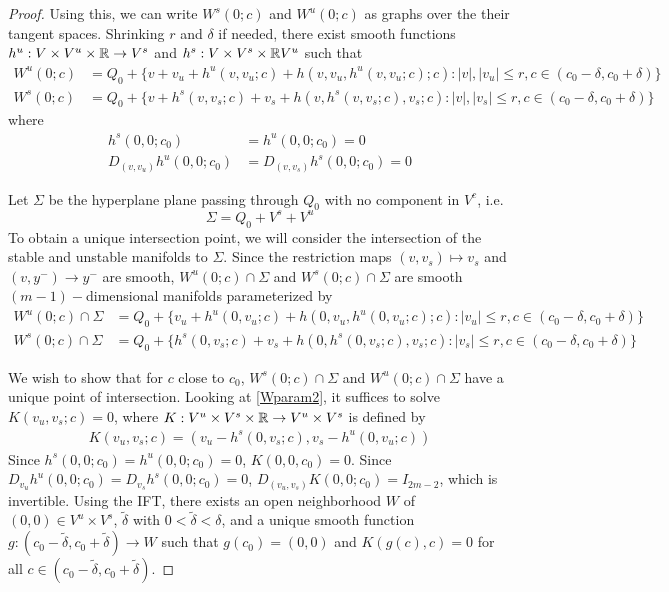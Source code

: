\documentclass[thesis.tex]{subfiles}
\begin{document}
\begin{lemma}
\begin{proof}
Using this, we can write $W^s(0; c)$ and $W^u(0; c)$ as graphs over the their tangent spaces. Shrinking $r$ and $\delta$ if needed, there exist smooth functions $h^u: V \times V^u \times \mathbb{R} \rightarrow V^s$ and $h^s: V \times V^s \times \mathbb{R} V^u$ such that 
\begin{equation}\label{Wparam1}
\begin{aligned}
W^u(0; c) &= Q_0 + \{ v + v_u + h^u(v, v_u; c) + h(v, v_u, h^u(v, v_u; c); c): |v|, |v_u| \leq r, c \in (c_0 - \delta, c_0 + \delta) \} \\
W^s(0; c) &= Q_0 + \{ v + h^s(v, v_s; c) + v_s + h(v, h^s(v, v_s; c), v_s; c): |v|, |v_s| \leq r, c \in (c_0 - \delta, c_0 + \delta)  \}
\end{aligned}
\end{equation}
where
\begin{align*}
h^s(0, 0; c_0) &= h^u(0, 0; c_0) = 0 \\
D_{(v, v_u)} h^u(0, 0; c_0) &= D_{(v, v_s)}  h^s(0, 0; c_0) = 0
\end{align*}

Let $\Sigma$ be the hyperplane plane passing through $Q_0$ with no component in $V^c$, i.e.
\[
\Sigma = Q_0 + V^s + V^u
\]
To obtain a unique intersection point, we will consider the intersection of the stable and unstable manifolds to $\Sigma$. Since the restriction maps $(v, v_s) \mapsto v_s$ and $(v, y^-) \rightarrow y^-$ are smooth, $W^u(0; c) \cap \Sigma$ and $W^s(0; c) \cap \Sigma$ are smooth $(m-1)-$dimensional manifolds parameterized by
\begin{equation}\label{Wparam2}
\begin{aligned}
W^u(0; c) \cap \Sigma &= Q_0 + \{ v_u + h^u(0, v_u; c) + h(0, v_u, h^u(0, v_u; c); c): |v_u| \leq r, c \in (c_0 - \delta, c_0 + \delta) \} \\
W^s(0; c) \cap \Sigma &= Q_0 + \{ h^s(0, v_s; c) + v_s + h(0, h^s(0, v_s; c), v_s; c): |v_s| \leq r, c \in (c_0 - \delta, c_0 + \delta) \}
\end{aligned}
\end{equation}

We wish to show that for $c$ close to $c_0$, $W^s(0; c) \cap \Sigma$ and $W^u(0; c) \cap \Sigma$ have a unique point of intersection. Looking at \eqref{Wparam2}, it suffices to solve $K(v_u, v_s; c) = 0$, where $K: V^u \times V^s \times \mathbb{R} \rightarrow V^u \times V^s$ is defined by
\begin{align*}
K(v_u, v_s; c) = (v_u - h^s(0, v_s; c), v_s - h^u(0, v_u; c))
\end{align*}
Since $h^s(0, 0; c_0) = h^u(0, 0; c_0) = 0$, $K(0, 0, c_0) = 0$. Since $D_{v_u} h^u(0, 0; c_0) = D_{v_s} h^s(0, 0; c_0) = 0$, 
$D_{(v_u, v_s)}K(0, 0; c_0) = I_{2m-2}$, which is invertible. Using the IFT, there exists an open neighborhood $W$ of $(0, 0) \in V^u \times V^s$, $\tilde{\delta}$ with $0 < \tilde{\delta} < \delta$, and a unique smooth function $g: (c_0 - \tilde{\delta}, c_0 + \tilde{\delta}) \rightarrow W$ such that $g(c_0) = (0, 0)$ and $K(g(c), c) = 0$ for all $c \in (c_0 - \tilde{\delta}, c_0 + \tilde{\delta})$.


\end{proof}
\end{lemma}
\end{document}
